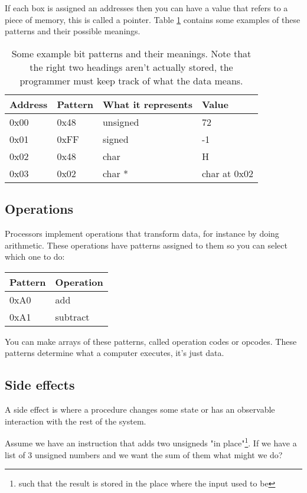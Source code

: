 \documentclass{article}
\begin{document}
If each box is assigned an addresses then you can have a value that refers to a
piece of memory, this is called a pointer. Table \ref{pattern_examples} contains
some examples of these patterns and their possible meanings.
\begin{table}[h]
\centering
\begin{tabular}{| l | l || l | l |}
\hline
Address & Pattern & What it represents & Value \\
\hline
0x00 & 0x48 & unsigned & 72 \\
0x01 & 0xFF & signed & -1 \\
0x02 & 0x48 & char & H \\
0x03 & 0x02 & char * & char at 0x02 \\
\hline
\end{tabular}
\caption{Some example bit patterns and their meanings. Note that the right two
headings aren't actually stored, the programmer must keep track of what the
data means.}
\label{pattern_examples}
\end{table}

\subsection{Operations}
Processors implement operations that transform data, for instance by doing
arithmetic. These operations have patterns assigned to them so you can select
which one to do:
\begin{table}[h]
\centering
\begin{tabular}{| l | l |}
\hline
Pattern & Operation \\
\hline
0xA0 & add \\
0xA1 & subtract \\
\hline
\end{tabular}
\label{opcodes}
\end{table}

You can make arrays of these patterns, called operation codes or opcodes.
These patterns determine what a computer executes, it's just data.

\subsection{Side effects}
A side effect is where a procedure changes some state or has an observable
interaction with the rest of the system.

Assume we have an instruction that adds two unsigneds "in place"\footnote{such
that the result is stored in the place where the input used to be}.
If we have a list of 3 unsigned numbers and we want the sum of them what might we do?
\end{document}
